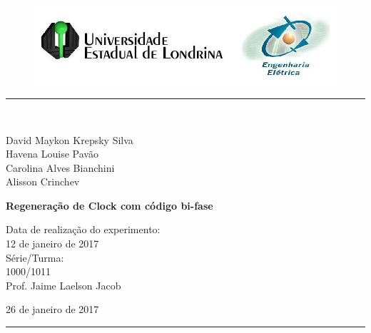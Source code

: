 \begin{titlepage}
\begin{center}
\begin{figure}[h]
\includegraphics[scale=0.76]{img/topdotitulo.png}
\end{figure}
\rule{\columnwidth}{1.5mm}
\

\large David Maykon Krepsky Silva	\\
	   Havena Louise Pavão \\
	   Carolina Alves Bianchini \\
	   Alisson Crinchev

\vspace{4cm}
{\bf \Large Regeneração de Clock com código bi-fase}
\vspace{3.5cm}

\begin{flushright}
Data de realização do experimento:\\
12 de janeiro de 2017\\
Série/Turma:\\
1000/1011\\
Prof. Jaime Laelson Jacob
\end{flushright}

\vspace{3.2cm}
26 de janeiro de 2017

\rule{\columnwidth}{1.3mm}
\end{center}
\end{titlepage}
